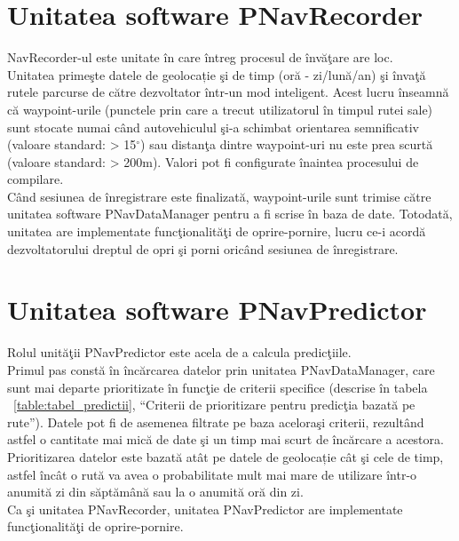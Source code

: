 \section{Unitatea software PNavRecorder} 
NavRecorder-ul este unitate în care întreg procesul de învăţare are loc. 
\vspace{6pt}
\\Unitatea primeşte datele de geolocație şi de timp (oră - zi/lună/an) şi învaţă rutele parcurse de către dezvoltator într-un mod inteligent.
Acest lucru înseamnă că waypoint-urile (punctele prin care a trecut utilizatorul în timpul rutei sale) sunt stocate numai când autovehiculul şi-a schimbat 
orientarea semnificativ (valoare standard: > 15$^{\circ}$) sau distanţa dintre waypoint-uri nu este prea scurtă (valoare standard: > 200m). Valori pot fi configurate înaintea procesului de compilare.
\vspace{6pt}
\\Când sesiunea de înregistrare este finalizată, waypoint-urile sunt trimise către unitatea software PNavDataManager pentru a fi scrise în baza de date.
Totodată, unitatea are implementate funcţionalităţi de oprire-pornire, lucru ce-i acordă dezvoltatorului dreptul de opri şi porni oricând sesiunea de înregistrare.


\section{Unitatea software PNavPredictor} 
Rolul unităţii PNavPredictor este acela de a calcula predicţiile. 
\vspace{6pt}
\\Primul pas constă în încărcarea datelor prin unitatea PNavDataManager, care sunt mai departe prioritizate în funcţie de criterii specifice (descrise în tabela ~\ref{table:tabel_predictii}, ``Criterii de prioritizare pentru predicţia bazată pe rute''). Datele pot fi de asemenea filtrate pe baza aceloraşi criterii, rezultând astfel o cantitate mai mică de date şi un timp mai scurt de încărcare a acestora. 
\vspace{6pt}
\\Prioritizarea datelor este bazată atât pe datele de geolocație cât şi cele de timp, astfel încât o rută va avea o probabilitate mult mai mare de utilizare într-o anumită zi din săptămână sau la o anumită oră din zi.
\vspace{6pt}
\\Ca şi unitatea PNavRecorder, unitatea PNavPredictor are implementate funcţionalităţi de oprire-pornire.


